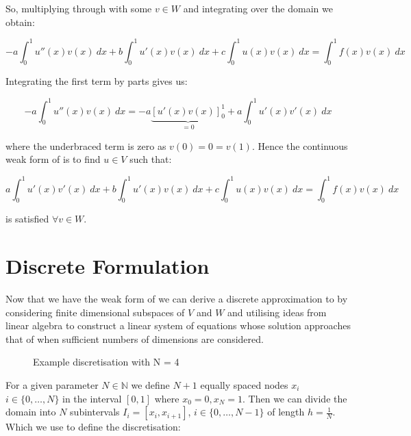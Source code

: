 So, multiplying through with some $v \in W$ and integrating over the domain we
obtain:

\begin{equation}
    -a\int_0^1{u''(x)v(x)\ dx} + b\int_0^1{u'(x)v(x)\ dx}
    + c\int_0^1{u(x)v(x)\ dx} = \int_0^1{f(x)v(x)\ dx}
\end{equation}

Integrating the first term by parts gives us:

\begin{equation}
    -a\int_0^1{u''(x)v(x)\ dx} = -a\underbrace{[ u'(x)v(x) ]_0^1}_{ = 0}
    + a\int_0^1{u'(x)v'(x)\ dx}
\end{equation}

where the underbraced term is zero as $v(0) = 0 = v(1)$.
Hence the continuous weak form of  is to find $u
\in V$ such that:

\begin{equation}\label{eq:wk-oned-deterministic}
    a\int_0^1{u'(x)v'(x)\ dx} + b\int_0^1{u'(x)v(x)\ dx}
    + c\int_0^1{u(x)v(x)\ dx} = \int_0^1{f(x)v(x)\ dx}
\end{equation}

is satisfied $\forall v \in W$.

\section{Discrete Formulation}

Now that we have the weak form of  we can derive a
discrete approximation to  by considering
finite dimensional subspaces of $V$ and $W$ and utilising ideas from linear
algebra to construct a linear system of equations whose solution approaches
that of  when sufficient numbers of dimensions
are considered.

\begin{figure}
\centering

\caption{Example discretisation with N = 4}
\label{fig:one-d-discretisation}
\end{figure}

For a given parameter $N \in \mathbb{N}$ we define $N+1$ equally spaced nodes
$x_i$ $i \in \{0, \ldots, N\}$ in the interval $[0,1]$ where
$x_0 = 0, x_N = 1$. Then we can divide the domain into $N$ subintervals
$ I_i = [x_i, x_{i+1}]$, $i \in \{0,\ldots,N - 1\}$ of length $h = \frac{1}{N}$.
Which we use to define the discretisation:

